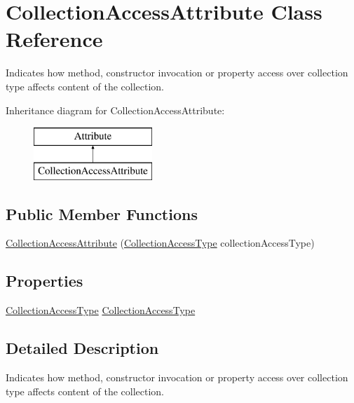 \hypertarget{class_collection_access_attribute}{}\section{Collection\+Access\+Attribute Class Reference}
\label{class_collection_access_attribute}


Indicates how method, constructor invocation or property access over collection type affects content of the collection.  


Inheritance diagram for Collection\+Access\+Attribute\+:\begin{figure}[H]
\begin{center}
\leavevmode
\includegraphics[height=2.000000cm]{class_collection_access_attribute}
\end{center}
\end{figure}
\subsection*{Public Member Functions}
\begin{DoxyCompactItemize}
\item 
\hyperlink{class_collection_access_attribute_a14445128bbc836c5876b84ac71307e91}{Collection\+Access\+Attribute} (\hyperlink{_annotations_8cs_ac934271c5bff522bfe4934d1e7be46a8}{Collection\+Access\+Type} collection\+Access\+Type)
\end{DoxyCompactItemize}
\subsection*{Properties}
\begin{DoxyCompactItemize}
\item 
\hyperlink{_annotations_8cs_ac934271c5bff522bfe4934d1e7be46a8}{Collection\+Access\+Type} \hyperlink{class_collection_access_attribute_a6f4227ee9e50c5103d73637cef1a3a9e}{Collection\+Access\+Type}
\end{DoxyCompactItemize}


\subsection{Detailed Description}
Indicates how method, constructor invocation or property access over collection type affects content of the collection. 



